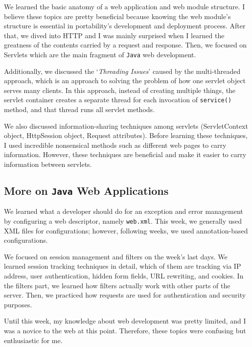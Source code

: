 We learned the basic anatomy of a web application and web module structure. I believe these topics are pretty beneficial because knowing the web module's structure is essential in portability's development and deployment process. After that, we dived into HTTP and I was mainly surprised when I learned the greatness of the contents carried by a request and response. Then, we focused on Servlets which are the main fragment of \texttt{Java} web development. 

Additionally, we discussed the `\textit{Threading Issues}' caused by the multi-threaded approach, which is an approach to solving the problem of how one servlet object serves many clients. In this approach, instead of creating multiple things, the servlet container creates a separate thread for each invocation of \texttt{service()} method, and that thread runs all servlet methods.

We also discussed information-sharing techniques among servlets (ServletContext object, HttpSession object, Request attributes). Before learning these techniques, I used incredible nonsensical methods such as different web pages to carry information. However, these techniques are beneficial and make it easier to carry information between servlets.

\subsection{More on \texttt{Java} Web Applications}

We learned what a developer should do for an exception and error management by configuring a web descriptor, namely \texttt{web.xml}. This week, we generally used XML files for configurations; however, following weeks, we used annotation-based configurations.

We focused on session management and filters on the week's last days. We learned session tracking techniques in detail, which of them are tracking via IP address, user authentication, hidden form fields, URL rewriting, and cookies. In the filters part, we learned how filters actually work with other parts of the server. Then, we practiced how requests are used for authentication and security purposes.

Until this week, my knowledge about web development was pretty limited, and I was a novice to the web at this point. Therefore, these topics were confusing but enthusiastic for me.